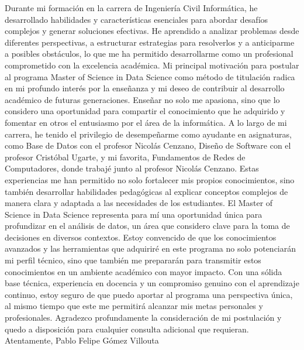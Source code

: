 \documentclass[12pt]{article}
\begin{document}
\noindent
Durante mi formación en la carrera de Ingeniería Civil Informática, he desarrollado habilidades y características esenciales para abordar desafíos complejos y generar soluciones efectivas. He aprendido a analizar problemas desde diferentes perspectivas, a estructurar estrategias para resolverlos y a anticiparme a posibles obstáculos, lo que me ha permitido desarrollarme como un profesional comprometido con la excelencia académica.
Mi principal motivación para postular al programa Master of Science in Data Science como método de titulación radica en mi profundo interés por la enseñanza y mi deseo de contribuir al desarrollo académico de futuras generaciones. Enseñar no solo me apasiona, sino que lo considero una oportunidad para compartir el conocimiento que he adquirido y fomentar en otros el entusiasmo por el área de la informática.
A lo largo de mi carrera, he tenido el privilegio de desempeñarme como ayudante en asignaturas, como Base de Datos con el profesor Nicolás Cenzano, Diseño de Software con el profesor Cristóbal Ugarte, y mi favorita, Fundamentos de Redes de Computadores, donde trabajé junto al profesor Nicolás Cenzano. Estas experiencias me han permitido no solo fortalecer mis propios conocimientos, sino también desarrollar habilidades pedagógicas al explicar conceptos complejos de manera clara y adaptada a las necesidades de los estudiantes.
El Master of Science in Data Science representa para mí una oportunidad única para profundizar en el análisis de datos, un área que considero clave para la toma de decisiones en diversos contextos. Estoy convencido de que los conocimientos avanzados y las herramientas que adquiriré en este programa no solo potenciarán mi perfil técnico, sino que también me prepararán para transmitir estos conocimientos en un ambiente académico con mayor impacto.
Con una sólida base técnica, experiencia en docencia y un compromiso genuino con el aprendizaje continuo, estoy seguro de que puedo aportar al programa una perspectiva única, al mismo tiempo que este me permitirá alcanzar mis metas personales y profesionales.
Agradezco profundamente la consideración de mi postulación y quedo a disposición para cualquier consulta adicional que requieran.
Atentamente,
Pablo Felipe Gómez Villouta
\end{document}
